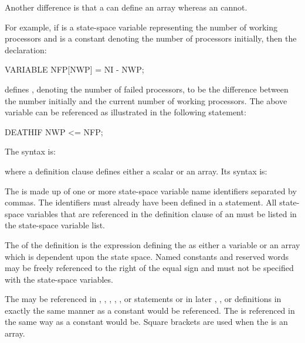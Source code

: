 Another difference is that a  can define an array whereas
an  cannot.

For example, if  is a state-space variable representing the number
of working processors and  is a constant denoting the number of
processors initially, then the declaration:
\begin{codeexample}
VARIABLE NFP[NWP] = NI - NWP;
\end{codeexample}
defines , denoting the number of failed processors, to
be the difference between the number initially and the current
number of working processors.  The above variable can be
referenced as illustrated in the following  statement:
\begin{codeexample}
DEATHIF NWP <= NFP;
\end{codeexample}

The syntax is:
\begin{syntaxexample}
  \literal{[}  \literal{]} \literal{=}   \literal{;}
\end{syntaxexample}
where a definition clause defines either a scalar or an array.  Its syntax is:
\begin{syntaxexample}
\orline{3mm}
\literal{[}    \literal{]}
\orline{3mm}
    \literal{)}
\end{syntaxexample}


The
is made up of one or more state-space
variable name identifiers separated by commas.
The identifiers must already have been defined in a 
statement.
All state-space variables that are referenced in the
definition clause of an  must be listed in the state-space variable list.

The  of the  definition is the expression defining
the  as either a variable or an array which is dependent upon the state space.
Named constants and reserved words may be freely referenced to the right of the equal sign
and must not be specified with the state-space variables.

The  may be referenced
in , ,
, , , or 
statements or in later , , or  definitions in
exactly the same manner as a constant would be referenced.
The  is referenced in the same way as a constant would be.  Square brackets
are used when the  is an array.


